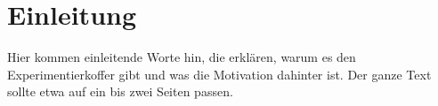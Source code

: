\newpage
\chapter{Einleitung}

Hier kommen einleitende Worte hin, die erklären, warum es den Experimentierkoffer gibt und was die Motivation dahinter ist.
Der ganze Text sollte etwa auf ein bis zwei Seiten passen.
